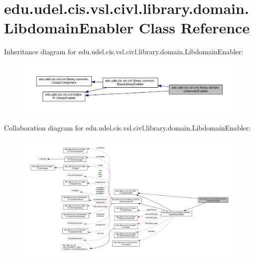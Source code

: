 \hypertarget{classedu_1_1udel_1_1cis_1_1vsl_1_1civl_1_1library_1_1domain_1_1LibdomainEnabler}{}\section{edu.\+udel.\+cis.\+vsl.\+civl.\+library.\+domain.\+Libdomain\+Enabler Class Reference}
\label{classedu_1_1udel_1_1cis_1_1vsl_1_1civl_1_1library_1_1domain_1_1LibdomainEnabler}


Inheritance diagram for edu.\+udel.\+cis.\+vsl.\+civl.\+library.\+domain.\+Libdomain\+Enabler\+:
\nopagebreak
\begin{figure}[H]
\begin{center}
\leavevmode
\includegraphics[width=350pt]{classedu_1_1udel_1_1cis_1_1vsl_1_1civl_1_1library_1_1domain_1_1LibdomainEnabler__inherit__graph}
\end{center}
\end{figure}


Collaboration diagram for edu.\+udel.\+cis.\+vsl.\+civl.\+library.\+domain.\+Libdomain\+Enabler\+:
\nopagebreak
\begin{figure}[H]
\begin{center}
\leavevmode
\includegraphics[width=350pt]{classedu_1_1udel_1_1cis_1_1vsl_1_1civl_1_1library_1_1domain_1_1LibdomainEnabler__coll__graph}
\end{center}
\end{figure}
